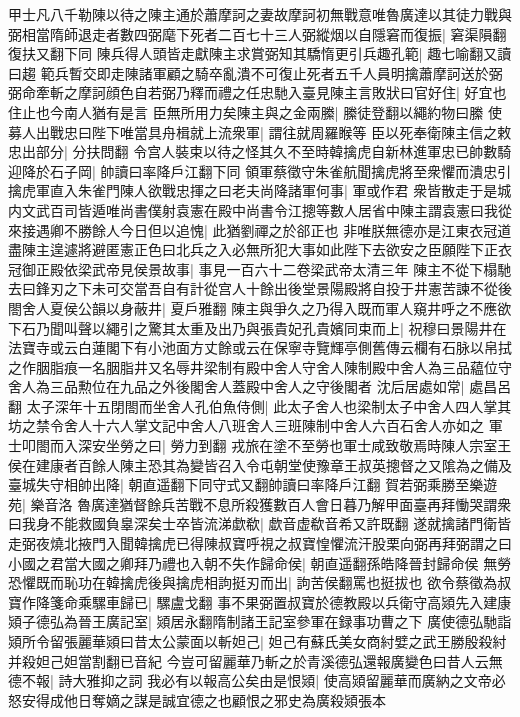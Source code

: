 甲士凡八千勒陳以待之陳主通於蕭摩訶之妻故摩訶初無戰意唯魯廣達以其徒力戰與弼相當隋師退走者數四弼麾下死者二百七十三人弼縱烟以自隱窘而復振|{
	窘渠隕翻復扶又翻下同}
陳兵得人頭皆走獻陳主求賞弼知其驕惰更引兵趣孔範|{
	趣七喻翻又讀曰趨}
範兵暫交即走陳諸軍顧之騎卒亂潰不可復止死者五千人員明擒蕭摩訶送於弼弼命牽斬之摩訶顔色自若弼乃釋而禮之任忠馳入臺見陳主言敗狀曰官好住|{
	好宜也住止也今南人猶有是言}
臣無所用力矣陳主與之金兩縢|{
	縢徒登翻以繩約物曰縢}
使募人出戰忠曰陛下唯當具舟楫就上流衆軍|{
	謂往就周羅睺等}
臣以死奉衛陳主信之敕忠出部分|{
	分扶問翻}
令宫人裝束以待之怪其久不至時韓擒虎自新林進軍忠已帥數騎迎降於石子岡|{
	帥讀曰率降戶江翻下同}
領軍蔡徵守朱雀航聞擒虎將至衆懼而潰忠引擒虎軍直入朱雀門陳人欲戰忠揮之曰老夫尚降諸軍何事|{
	軍或作君}
衆皆散走于是城内文武百司皆遁唯尚書僕射袁憲在殿中尚書令江摠等數人居省中陳主謂袁憲曰我從來接遇卿不勝餘人今日但以追愧|{
	此猶劉禪之於郤正也}
非唯朕無德亦是江東衣冠道盡陳主遑遽將避匿憲正色曰北兵之入必無所犯大事如此陛下去欲安之臣願陛下正衣冠御正殿依梁武帝見侯景故事|{
	事見一百六十二卷梁武帝太清三年}
陳主不從下榻馳去曰鋒刃之下未可交當吾自有計從宫人十餘出後堂景陽殿將自投于井憲苦諫不從後閤舍人夏侯公韻以身蔽井|{
	夏戶雅翻}
陳主與爭久之乃得入既而軍人窺井呼之不應欲下石乃聞叫聲以繩引之驚其太重及出乃與張貴妃孔貴嬪同束而上|{
	祝穆曰景陽井在法寶寺或云白蓮閣下有小池面方丈餘或云在保寧寺覽輝亭側舊傳云欄有石脉以帛拭之作胭脂痕一名胭脂井又名辱井梁制有殿中舍人守舍人陳制殿中舍人為三品藴位守舍人為三品勲位在九品之外後閣舍人蓋殿中舍人之守後閣者}
沈后居處如常|{
	處昌呂翻}
太子深年十五閉閤而坐舍人孔伯魚侍側|{
	此太子舍人也梁制太子中舍人四人掌其坊之禁令舍人十六人掌文記中舍人八班舍人三班陳制中舍人六百石舍人亦如之}
軍士叩閤而入深安坐勞之曰|{
	勞力到翻}
戎旅在塗不至勞也軍士咸致敬焉時陳人宗室王侯在建康者百餘人陳主恐其為變皆召入令屯朝堂使豫章王叔英摠督之又隂為之備及臺城失守相帥出降|{
	朝直遥翻下同守式又翻帥讀曰率降戶江翻}
賀若弼乘勝至樂遊苑|{
	樂音洛}
魯廣達猶督餘兵苦戰不息所殺獲數百人會日暮乃解甲面臺再拜慟哭謂衆曰我身不能救國負辠深矣士卒皆流涕歔欷|{
	歔音虚欷音希又許既翻}
遂就擒諸門衛皆走弼夜燒北掖門入聞韓擒虎已得陳叔寶呼視之叔寶惶懼流汗股栗向弼再拜弼謂之曰小國之君當大國之卿拜乃禮也入朝不失作歸命侯|{
	朝直遥翻孫皓降晉封歸命侯}
無勞恐懼既而恥功在韓擒虎後與擒虎相訽挺刃而出|{
	訽苦侯翻罵也挺拔也}
欲令蔡徵為叔寶作降箋命乘騾車歸已|{
	騾盧戈翻}
事不果弼置叔寶於德教殿以兵衛守高熲先入建康熲子德弘為晉王廣記室|{
	熲居永翻隋制諸王記室參軍在録事功曹之下}
廣使德弘馳詣熲所令留張麗華熲曰昔太公蒙面以斬妲己|{
	妲己有蘇氏美女商紂嬖之武王勝殷殺紂并殺妲己妲當割翻已音紀}
今豈可留麗華乃斬之於青溪德弘還報廣變色曰昔人云無德不報|{
	詩大雅抑之詞}
我必有以報高公矣由是恨熲|{
	使高熲留麗華而廣納之文帝必怒安得成他日奪嫡之謀是誠宜德之也顧恨之邪史為廣殺熲張本}
